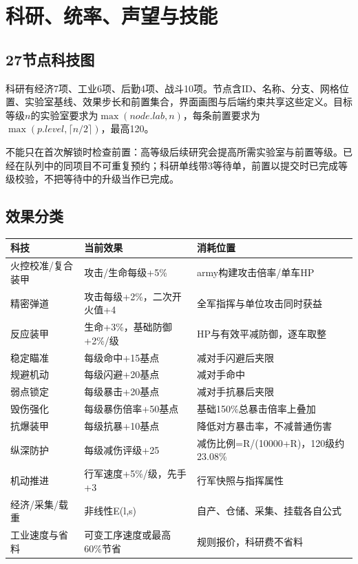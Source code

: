 \chapter{科研、统率、声望与技能}
\section{27节点科技图}
科研有经济7项、工业6项、后勤4项、战斗10项。节点含ID、名称、分支、网格位置、实验室基线、效果步长和前置集合，界面画图与后端约束共享这些定义。目标等级\(n\)的实验室要求为\(\max(node.lab,n)\)，每条前置要求为\(\max(p.level,\lceil n/2\rceil)\)，最高120。

不能只在首次解锁时检查前置：高等级后续研究会提高所需实验室与前置等级。已经在队列中的同项目不可重复预约；科研单线带3等待单，前置以提交时已完成等级校验，不把等待中的升级当作已完成。

\section{效果分类}
\begin{small}\begin{longtable}{@{}P{43mm}P{42mm}P{59mm}@{}}
\toprule 科技 & 当前效果 & 消耗位置\\\midrule\endhead
火控校准/复合装甲 & 攻击/生命每级+5\% & army构建攻击倍率/单车HP\\
精密弹道 & 攻击每级+2\%，二次开火值+4 & 全军指挥与单位攻击同时获益\\
反应装甲 & 生命+3\%，基础防御+2\%/级 & HP与有效平减防御，逐车取整\\
稳定瞄准 & 每级命中+15基点 & 减对手闪避后夹限\\
规避机动 & 每级闪避+20基点 & 减对手命中\\
弱点锁定 & 每级暴击+20基点 & 减对手抗暴后夹限\\
毁伤强化 & 每级暴伤倍率+50基点 & 基础150\%总暴击倍率上叠加\\
抗爆装甲 & 每级抗暴+10基点 & 降低对方暴击率，不减普通伤害\\
纵深防护 & 每级减伤评级+25 & 减伤比例=R/(10000+R)，120级约23.08\%\\
机动推进 & 行军速度+5\%/级，先手+3 & 行军快照与指挥属性\\
经济/采集/载重 & 非线性E(l,s) & 自产、仓储、采集、挂载各自公式\\
工业速度与省料 & 可变工序速度或最高60\%节省 & 规则报价，科研费不省料\\
\bottomrule\end{longtable}\end{small}

